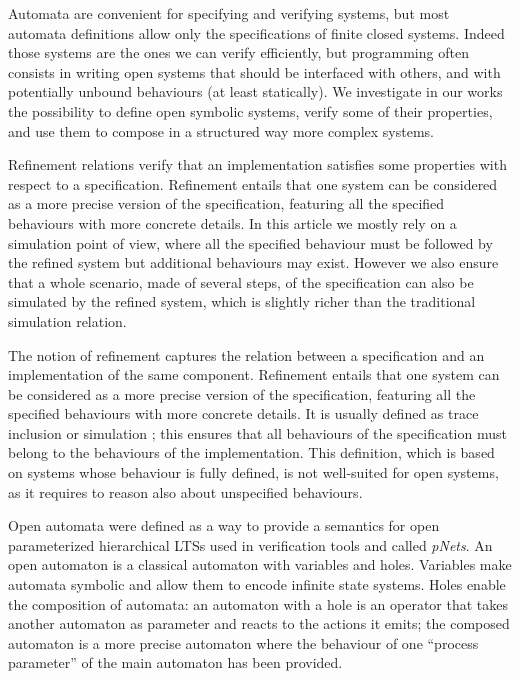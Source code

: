 \documentclass[runningheads]{llncs}
\begin{document}
Automata are convenient for specifying and verifying systems, but most automata definitions allow only the specifications of finite closed systems. Indeed those systems are the ones we can verify efficiently, but programming often consists in writing open systems that should be interfaced with others, and with potentially unbound behaviours (at least statically). We investigate in our works the possibility to define open symbolic systems, verify some of their properties, and use them to compose in a structured way more complex systems.


Refinement relations verify that an implementation satisfies some properties with respect to a specification. Refinement entails that one system can be considered as a more precise version of the specification, featuring all the specified behaviours with more concrete details. In this article we mostly rely on a simulation point of view, where all the specified behaviour must be followed by the refined system but additional behaviours may exist. However we also ensure that a whole scenario, made of several steps, of the specification can also be simulated by the refined system, which is slightly richer than the traditional simulation relation.


The notion of refinement  captures the relation between  a specification and an implementation of the same component. Refinement entails that one system can be considered as a more precise version of the specification, featuring all the specified behaviours with more concrete details. 
 It is usually defined as trace inclusion or simulation  \cite{Milner:1980,Kouchnarenko:2007}; this ensures that all behaviours of the specification must belong to the behaviours of the implementation. 
 This definition, which is based on systems whose behaviour is fully defined, is not well-suited for open systems,  as it requires to reason also about unspecified behaviours.


Open automata were defined as a way to provide a semantics for open parameterized hierarchical LTSs used in verification tools and called \emph{pNets}.
An open automaton \cite{henrio:01299562} is a classical automaton with variables and holes. Variables make automata symbolic and allow them to encode infinite state systems. Holes enable the composition of automata: an automaton with a hole is an operator that takes another automaton as parameter and reacts to the actions it emits; the composed automaton is a more precise automaton where the behaviour of one ``process parameter'' %
 of the main automaton has been provided.
\end{document}

